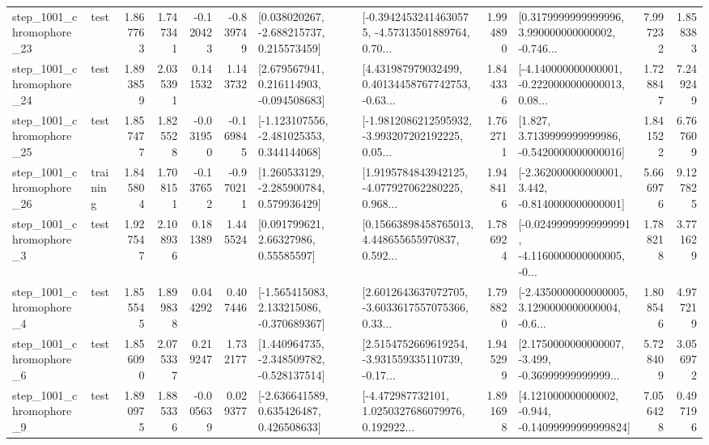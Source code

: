 \begin{tabular}{llrrrrllrlrr}
 step\_1001\_chromophore\_23 &      test &      1.867763 &    1.747341 &     -0.120423 & -0.839749 &    [0.038020267, -2.688215737, 0.215573459] &  [-0.39424532414630575, -4.57313501889764, 0.70... &       1.994890 &  [0.3179999999999996, 3.990000000000002, -0.746... &            7.997232 &          1.858383 \\
 step\_1001\_chromophore\_24 &      test &      1.893859 &    2.035391 &      0.141532 &  1.143732 &    [2.679567941, 0.216114903, -0.094508683] &  [4.431987979032499, 0.40134458767742753, -0.63... &       1.844336 &  [-4.140000000000001, -0.2220000000000013, 0.08... &            1.728847 &          7.249249 \\
 step\_1001\_chromophore\_25 &      test &      1.857477 &    1.825528 &     -0.031950 & -0.169845 &   [-1.123107556, -2.481025353, 0.344144068] &  [-1.9812086212595932, -3.993207202192225, 0.05... &       1.762711 &   [1.827, 3.7139999999999986, -0.5420000000000016] &            1.841522 &          6.767609 \\
 step\_1001\_chromophore\_26 &  training &      1.845804 &    1.708151 &     -0.137652 & -0.970211 &    [1.260533129, -2.285900784, 0.579936429] &  [1.9195784843942125, -4.077927062280225, 0.968... &       1.948416 &   [-2.362000000000001, 3.442, -0.8140000000000001] &            5.666976 &          9.127825 \\
  step\_1001\_chromophore\_3 &      test &      1.927547 &    2.108936 &      0.181389 &  1.445524 &       [0.091799621, 2.66327986, 0.55585597] &  [0.15663898458765013, 4.448655655970837, 0.592... &       1.786924 &  [-0.02499999999999991, -4.1160000000000005, -0... &            1.788218 &          3.771629 \\
  step\_1001\_chromophore\_4 &      test &      1.855545 &    1.899838 &      0.044292 &  0.407446 &   [-1.565415083, 2.133215086, -0.370689367] &  [2.6012643637072705, -3.6033617557075366, 0.33... &       1.798820 &  [-2.4350000000000005, 3.1290000000000004, -0.6... &            1.808546 &          4.977219 \\
  step\_1001\_chromophore\_6 &      test &      1.856090 &    2.075337 &      0.219247 &  1.732177 &   [1.440964735, -2.348509782, -0.528137514] &  [2.5154752669619254, -3.931559335110739, -0.17... &       1.945299 &  [2.1750000000000007, -3.499, -0.36999999999999... &            5.728409 &          3.056972 \\
  step\_1001\_chromophore\_9 &      test &      1.890975 &    1.885336 &     -0.005639 &  0.029377 &    [-2.636641589, 0.635426487, 0.426508633] &  [-4.472987732101, 1.0250327686079976, 0.192922... &       1.891698 &  [4.121000000000002, -0.944, -0.14099999999999824] &            7.056428 &          0.497196 \\

\end{tabular}
